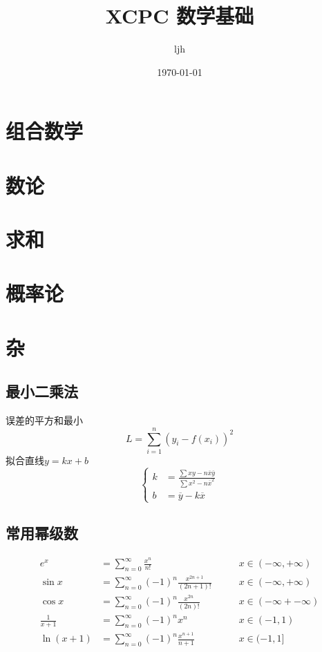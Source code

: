 \documentclass[12pt, a4paper, oneside]{ctexbook}
\title{{\Huge{\textbf{XCPC 数学基础}}}}
\author{ljh}
\date{\today}
\begin{document}
\maketitle

\setcounter{page}{1}

\newpage
{}
\setcounter{page}{1}
\tableofcontents
\newpage
\setcounter{page}{1}

\chapter{组合数学}


\chapter{数论}


\chapter{求和}




\chapter{概率论}



\chapter{杂}
\section{最小二乘法}
误差的平方和最小\\
$$
  L=\sum_{i=1}^{n} (y_i-f(x_i))^2
$$
拟合直线$y=kx+b$ 
$$
  \begin{cases}
    k&=\frac{\sum xy- n \overline{x}\overline{y}}{\sum x^2-n\overline{x}^2}\\
    b&=\overline{y}-k\overline{x}
  \end{cases}
$$

\section{常用幂级数}
$$
\begin{aligned}
e^x&=\sum_{n=0}^{\infty}\frac{x^n}{n!} \qquad& x\in(-\infty,+\infty)\\
\sin x&=\sum_{n=0}^{\infty}(-1)^n\frac{x^{2n+1}}{(2n+1)!} \qquad& x\in(-\infty,+\infty)\\
\cos x&=\sum_{n=0}^{\infty}(-1)^n\frac{x^{2n}}{(2n)!} \qquad& x\in(-\infty+-\infty)\\
\frac{1}{x+1}&=\sum_{n=0}^{\infty}(-1)^nx^n \qquad& x\in(-1,1)\\
\ln{(x+1)}&=\sum_{n=0}^{\infty}(-1)^n\frac{x^{n+1}}{n+1}\qquad&x\in(-1,1]
\end{aligned}
$$
\end{document}
